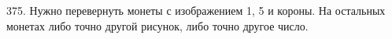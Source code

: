 375. Нужно перевернуть монеты с изображением 1, 5 и короны. На остальных монетах либо точно другой рисунок, либо точно другое число.\\
